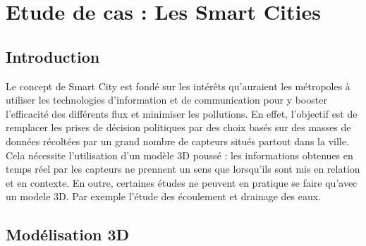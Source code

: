 \chapter{Etude de cas : Les Smart Cities}



\section{Introduction}
Le concept de Smart City est fondé sur les intérêts qu'auraient les métropoles à utiliser les technologies d'information et de communication pour y booster l'efficacité des différents flux et minimiser les pollutions. En effet, l'objectif est de remplacer les prises de décision politiques par des choix basés sur des masses de données récoltées par un grand nombre de capteurs situés partout dans la ville. Cela nécessite l'utilisation d'un modèle 3D poussé : les informations obtenues en temps réel par les capteurs ne prennent un sens que lorsqu'ils sont mis en relation et en contexte. En outre, certaines études ne peuvent en pratique se faire qu'avec un modele 3D. Par exemple l'étude des écoulement et drainage des eaux.


%


\section{Modélisation 3D}

